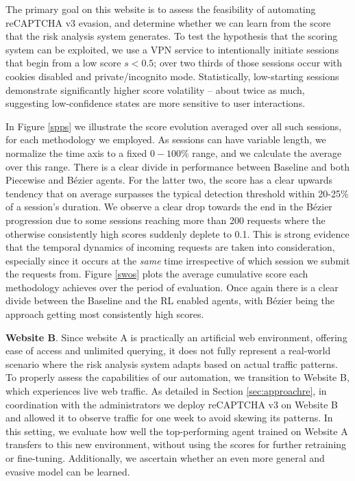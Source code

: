 The primary goal on this website is to assess the feasibility of automating reCAPTCHA v3 evasion, and determine whether we can learn from the score that the risk analysis system generates.
To test the hypothesis that the scoring system can be exploited, we use a \gls{VPN} service to intentionally initiate sessions that begin from a low score $s < 0.5$; over two thirds of those sessions occur with cookies disabled and private/incognito mode.
Statistically, low-starting sessions demonstrate significantly higher score volatility -- about twice as much, suggesting low-confidence states are more sensitive to user interactions.

In Figure \ref{spps} we illustrate the score evolution averaged over all such sessions, for each methodology we employed.
As sessions can have variable length, we normalize the time axis to a fixed $0-100\%$ range, and we calculate the average over this range.
There is a clear divide in performance between Baseline and both Piecewise and Bézier agents.
For the latter two, the score has a clear upwards tendency that on average surpasses the typical detection threshold within 20-25\% of a session's duration.
We observe a clear drop towards the end in the Bézier progression due to some sessions reaching more than 200 requests where the otherwise consistently high scores suddenly deplete to 0.1.
This is strong evidence that the temporal dynamics of incoming requests are taken into consideration, especially since it occurs at the \emph{same} time irrespective of which session we submit the requests from.
Figure \ref{swos} plots the average cumulative score each methodology achieves over the period of evaluation.
Once again there is a clear divide between the Baseline and the \gls{RL} enabled agents, with Bézier being the approach getting most consistently high scores.

\textbf{Website B}. Since website A is practically an artificial web environment, offering ease of access and unlimited querying, it does not fully represent a real-world scenario where the risk analysis system adapts based on actual traffic patterns.
To properly assess the capabilities of our automation, we transition to Website B, which experiences live web traffic.
As detailed in Section \ref{sec:approachre}, in coordination with the administrators we deploy reCAPTCHA v3 on Website B and allowed it to observe traffic for one week to avoid skewing its patterns.
In this setting, we evaluate how well the top-performing agent trained on Website A transfers to this new environment, without using the scores for further retraining or fine-tuning.
Additionally, we ascertain whether an even more general and evasive model can be learned.

